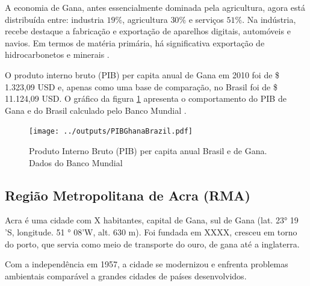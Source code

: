 A economia de Gana, antes essencialmente dominada pela agricultura, 
agora está distribuída entre: industria $19\%$, agricultura $30\%$ 
e serviços $51\%$. Na indústria, recebe destaque a fabricação e 
exportação de aparelhos digitais, automóveis e navios. 
Em termos de matéria primária, há significativa exportação de 
hidrocarbonetos e minerais \citep{ghanacensus2013}.
 
 
O produto interno bruto (PIB) per capita anual de Gana em 2010 foi
de \$ 1.323,09 USD e, apenas como uma base de comparação, no Brasil 
foi de \$ 11.124,09 USD. O gráfico da figura \ref{fg:pib} apresenta o 
comportamento do PIB de Gana e do Brasil calculado pelo Banco Mundial 
\citep{bancomundial}.




\begin{figure}[H]
\begin{center}
  \texttt{[image: ../outputs/PIBGhanaBrazil.pdf]}
  \caption{Produto Interno Bruto (PIB) per capita anual Brasil e de Gana. 
           Dados do Banco Mundial \citep{bancomundial} \label{fg:pib}}
\end{center}
\end{figure}


\subsection{Região Metropolitana de Acra (RMA)}


Acra é uma cidade com X habitantes, capital de Gana, 
sul de Gana (lat. 23° 19 'S, longitude. 51 ° 08'W, alt. 630 m). 
Foi fundada em XXXX, cresceu em torno do porto, que servia como meio de transporte
do ouro, de gana até a inglaterra. 

Com a independência em 1957, a cidade se modernizou e enfrenta problemas 
ambientais comparável a grandes cidades de países desenvolvidos. 

